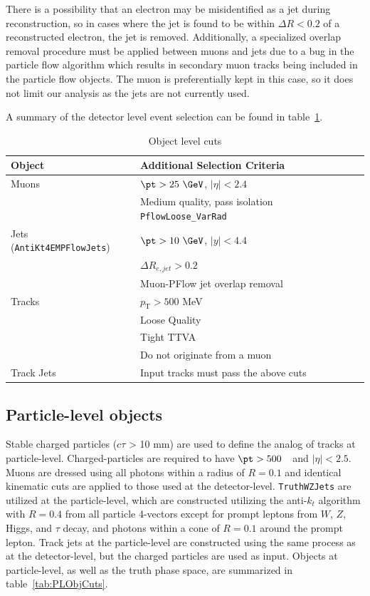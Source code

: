 There is a possibility that an electron may be misidentified as a jet during reconstruction, so in cases where the jet is found to be within $\Delta R < 0.2$ of a reconstructed electron, the jet is removed.
Additionally, a specialized overlap removal procedure must be applied between muons and jets due to a bug in the particle flow algorithm which results in secondary muon tracks being included in the particle flow objects.
The muon is preferentially kept in this case, so it does not limit our analysis as the jets are not currently used.

A summary of the detector level event selection can be found in table~\ref{tab:ObjCuts}.


\begin{table}[h!]
    \centering
    \begin{tabular}{l|l}
    \hline
     \textbf{Object} & \textbf{Additional Selection Criteria} \\ \hline
     Muons & $\pt>25~\GeV$, $|\eta|<2.4$ \\
           & Medium quality, pass isolation \texttt{PflowLoose\_VarRad} \\ \hline
     Jets (\texttt{AntiKt4EMPFlowJets}) & $\pt>10~\GeV$, $|y|<4.4$ \\
                                        & $\Delta R_{e,jet} > 0.2$ \\
                                        & Muon-PFlow jet overlap removal \\ \hline
     Tracks & $p_{\text{T}} > 500$ MeV \\
            & Loose Quality \\
            & Tight TTVA \\
            & Do not originate from a muon \\ \hline
     Track Jets & Input tracks must pass the above cuts \\ \hline
    \end{tabular}
    \caption{Object level cuts}
    \label{tab:ObjCuts}
\end{table}

\subsection{Particle-level objects}

Stable charged particles ($c\tau$ > 10 mm) are used to define the analog of tracks at particle-level. Charged-particles are required to have $\pt > 500$~\MeV~and $|\eta|<2.5$.
Muons are dressed using all photons within a radius of $R=0.1$ and identical kinematic cuts are applied to those used at the detector-level.
\texttt{TruthWZJets} are utilized at the particle-level, which are constructed utilizing the anti-$k_t$ algorithm with $R=0.4$ from all particle 4-vectors except for prompt leptons from $W$, $Z$, Higgs, and $\tau$ decay, and photons within a cone of $R=0.1$ around the prompt lepton.
Track jets at the particle-level are constructed using the same process as at the detector-level, but the charged particles are used as input.
Objects at particle-level, as well as the truth phase space, are summarized in table~\ref{tab:PLObjCuts}.

